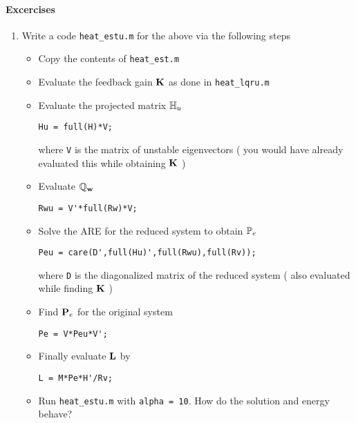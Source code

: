 \documentclass[12pt]{article}
\begin{document}
\paragraph{Excercises}

\begin{enumerate}

\item Write a code {\tt heat\_estu.m} for the above via the following steps
\begin{itemize}
\item Copy the contents of {\tt heat\_est.m}

\item Evaluate the feedback gain ${\mathbf K}$ as done in {\tt heat\_lqru.m}

\item Evaluate the projected matrix $\mathbb{H}_u$ 
\begin{lstlisting}
Hu = full(H)*V; 
\end{lstlisting}
where {\tt V} is the matrix of unstable eigenvectors ( you would have already evaluated this while obtaining ${\mathbf K}$ )

\item Evaluate $\mathbb{Q}_{\mathbf w}$ 
\begin{lstlisting}
Rwu = V'*full(Rw)*V; 
\end{lstlisting}

\item Solve the ARE for the reduced system to obtain $\mathbb{P}_e$
\begin{lstlisting}
Peu = care(D',full(Hu)',full(Rwu),full(Rv));
\end{lstlisting}
where {\tt D} is the diagonalized matrix of the reduced system ( also evaluated while finding ${\mathbf K}$ )

\item Find ${\mathbf P}_e$ for the original system
\begin{lstlisting}
Pe = V*Peu*V'; 
\end{lstlisting}

\item Finally evaluate ${\mathbf L}$ by
\begin{lstlisting}
L = M*Pe*H'/Rv; 
\end{lstlisting}

\item Run {\tt heat\_estu.m} with {\tt alpha = 10}. How do the solution and energy behave?

\end{itemize}


\end{enumerate}
\end{document}
